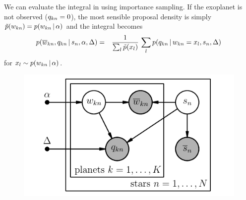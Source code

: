 \documentclass[12pt,preprint]{aastex}
\begin{document}
We can evaluate the integral in  using importance sampling.
If the exoplanet is not observed ($q_{kn}=0$), the most sensible proposal
density is simply $\tilde{p}(w_{kn})=p(w_{kn}\,|\,\alpha)$
and the integral becomes
\begin{eqnarray}
p(\overline{w}_{kn},q_{kn}\,|\,s_n,\alpha,\Delta) &=&
\frac{1}{\sum_l \tilde{p}(x_l)}\,\sum_l
p(q_{kn}\,|\,w_{kn}=x_l,s_{n},\Delta)
\end{eqnarray}
for $x_l \sim p(w_{kn}\,|\,\alpha)$.

\begin{figure}[htbp]
\begin{center}
    \includegraphics{gm.pdf}
\end{center}
\caption{%
}
\end{figure}
\end{document}
